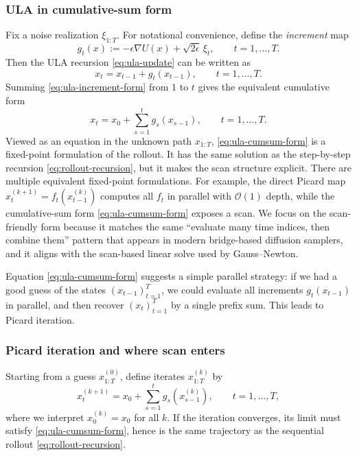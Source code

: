 \documentclass[11pt]{article}
\begin{document}
\subsubsection{ULA in cumulative-sum form}
\label{subsubsec:ula-cumsum}

Fix a noise realization $\xi_{1:T}$.
For notational convenience, define the \emph{increment} map
\[
g_t(x) := -\epsilon\nabla U(x)+\sqrt{2\epsilon}\,\xi_t,\qquad t=1,\dots,T.
\]
Then the ULA recursion \eqref{eq:ula-update} can be written as
\begin{equation}
  x_t = x_{t-1} + g_t(x_{t-1}),\qquad t=1,\dots,T.
  \label{eq:ula-increment-form}
\end{equation}
Summing \eqref{eq:ula-increment-form} from $1$ to $t$ gives the equivalent cumulative form
\begin{equation}
  x_t = x_0 + \sum_{s=1}^t g_s(x_{s-1}),\qquad t=1,\dots,T.
  \label{eq:ula-cumsum-form}
\end{equation}
Viewed as an equation in the unknown path $x_{1:T}$, \eqref{eq:ula-cumsum-form} is a fixed-point formulation of the rollout.
It has the same solution as the step-by-step recursion \eqref{eq:rollout-recursion}, but it makes the scan structure explicit.
There are multiple equivalent fixed-point formulations.
For example, the direct Picard map $x_t^{(k+1)}=f_t(x_{t-1}^{(k)})$ computes all $f_t$ in parallel with $\mathcal{O}(1)$ depth, while the cumulative-sum form \eqref{eq:ula-cumsum-form} exposes a scan.
We focus on the scan-friendly form because it matches the same ``evaluate many time indices, then combine them'' pattern that appears in modern bridge-based diffusion samplers, and it aligns with the scan-based linear solve used by Gauss--Newton.

Equation \eqref{eq:ula-cumsum-form} suggests a simple parallel strategy:
if we had a good guess of the states $(x_{t-1})_{t=1}^T$, we could evaluate all increments $g_t(x_{t-1})$ in parallel, and then recover $(x_t)_{t=1}^T$ by a single prefix sum.
This leads to Picard iteration.

\subsubsection{Picard iteration and where scan enters}
\label{subsubsec:picard-scan}

Starting from a guess $x_{1:T}^{(0)}$, define iterates $x_{1:T}^{(k)}$ by
\begin{equation}
  x_t^{(k+1)} = x_0 + \sum_{s=1}^t g_s\!\left(x_{s-1}^{(k)}\right),
  \qquad t=1,\dots,T,
  \label{eq:picard-ula}
\end{equation}
where we interpret $x_0^{(k)}=x_0$ for all $k$.
If the iteration converges, its limit must satisfy \eqref{eq:ula-cumsum-form}, hence is the same trajectory as the sequential rollout \eqref{eq:rollout-recursion}.
\end{document}
